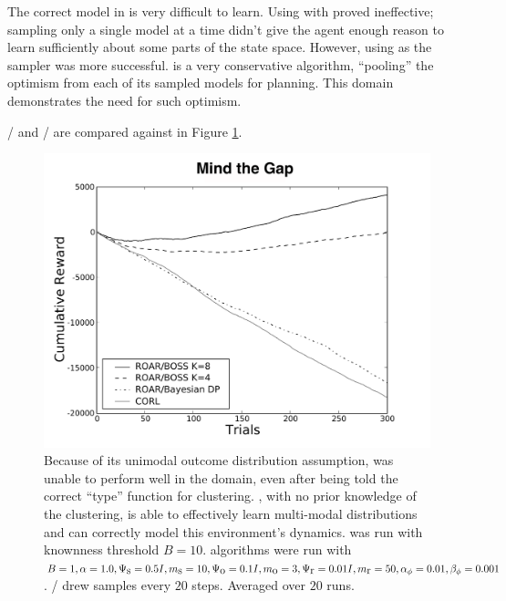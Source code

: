 The correct model in  is very difficult to learn. Using  with  proved ineffective; sampling only a single model at a time didn't give the agent enough reason to learn sufficiently about some parts of the state space. However, using  as the sampler was more successful.  is a very conservative algorithm, ``pooling'' the optimism from each of its sampled models for planning. This domain demonstrates the need for such optimism.

/ and / are compared against  in Figure \ref{fig:bridge2}.

\begin{figure}[t]
\vskip 0.2in
\begin{center}
\centerline{\includegraphics[width=\columnwidth]{bridge2Figure}}
\caption{Because of its unimodal outcome distribution assumption,  was unable to perform well in the  domain, even after being told the correct ``type'' function for clustering. , with no prior knowledge of the clustering, is able to effectively learn multi-modal distributions and can correctly model this environment's dynamics.  was run with knownness threshold $B=10$.  algorithms were run with $B=1, \alpha=1.0,\Psi_{\mbox s}=0.5I, m_{\mbox s}=10, \Psi_{\mbox o}=0.1I, m_{\mbox o}=3, \Psi_{\mbox r}=0.01I,m_{\mbox r}=50,\alpha_\phi=0.01,\beta_\phi=0.001$. / drew samples every $20$ steps. Averaged over $20$ runs.}
\label{fig:bridge2}
\end{center}
\vskip -0.2in
\end{figure} 






